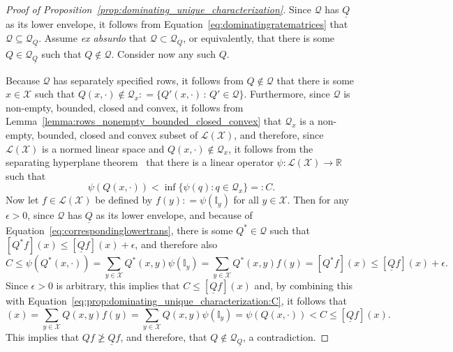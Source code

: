 \documentclass[10pt,a4paper]{paper}
\theoremstyle{definition}
\newcommand{\reals}{\mathbb{R}}
\newcommand{\states}{\mathcal{X}}
\newcommand{\gambles}{\mathcal{L}}
\newcommand{\gamblesX}{\gambles(\states)}
\newcommand{\ind}[1]{\mathbb{I}_{#1}}
\newcommand{\rateset}{\mathcal{Q}}
\newcommand{\lrate}{\underline{Q}}
\newcommand{\coloneqq}{:\!=}
\begin{document}
\begin{proof}[Proof of Proposition~\ref{prop:dominating_unique_characterization}]
Since $\rateset$ has $\lrate$ as its lower envelope, it follows from Equation~\eqref{eq:dominatingratematrices} that $\rateset\subseteq\rateset_{\lrate}$. Assume \emph{ex absurdo} that $\rateset\subset\rateset_{\lrate}$, or equivalently, that there is some $Q\in\rateset_{\lrate}$ such that $Q\notin\rateset$. Consider now any such $Q$.

Because $\rateset$ has separately specified rows, it follows from $Q\notin\rateset$ that there is some $x\in\states$ such that $Q(x,\cdot)\notin\rateset_x\coloneqq\{Q'(x,\cdot)\,:\,Q'\in\rateset\}$. Furthermore, since $\rateset$ is non-empty, bounded, closed and convex, it follows from Lemma~\ref{lemma:rows_nonempty_bounded_closed_convex} that $\rateset_x$ is a non-empty, bounded, closed and convex subset of $\gamblesX$, and therefore, since $\gamblesX$ is a normed linear space and $Q(x,\cdot)\notin\rateset_x$, it follows from the separating hyperplane theorem~\cite[Chapter 14, Corollary 25]{Royden:2010vn} that there is a linear operator $\psi\colon\gamblesX\to\reals$ such that
\begin{equation}\label{eq:prop:dominating_unique_characterization:C}
\psi(Q(x,\cdot))<\inf\{\psi(q)\colon q\in\rateset_x\}=\colon C.
\end{equation}
Now let $f\in\gamblesX$ be defined by $f(y)\coloneqq\psi(\ind{y})$ for all $y\in\states$. Then for any $\epsilon>0$, since $\rateset$ has $\lrate$ as its lower envelope, and because of Equation~\eqref{eq:correspondinglowertrans}, there is some $Q^*\in\rateset$ such that $[Q^*f](x)\leq[\lrate f](x)+\epsilon$, and therefore also
\begin{equation*}
C
\leq\psi(Q^*(x,\cdot))
=\sum_{y\in\states}Q^*(x,y)\psi(\ind{y})
=\sum_{y\in\states}Q^*(x,y)f(y)
=[Q^* f](x)\leq[\lrate f](x)+\epsilon.
\end{equation*}
Since $\epsilon>0$ is arbitrary, this implies that $C\leq[\lrate f](x)$ and, by combining this with Equation~\eqref{eq:prop:dominating_unique_characterization:C}, it follows that
\begin{equation*}
[Qf](x)
=\sum_{y\in\states}Q(x,y)f(y)
=\sum_{y\in\states}Q(x,y)\psi(\ind{y})
=\psi(Q(x,\cdot))
<C\leq[\lrate f](x).
\end{equation*}
This implies that $Qf\not\geq\lrate f$, and therefore, that $Q\notin\rateset_{\lrate}$, a contradiction.

\end{proof}
\end{document}
